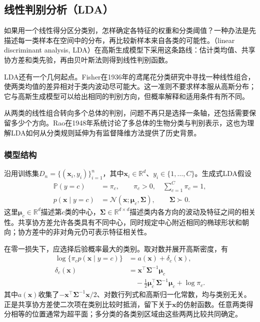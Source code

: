 \subsection{线性判别分析（LDA）}
\label{sec:classification-lda}

如果用一个线性得分区分类别，怎样确定各特征的权重和分类阈值？一种办法是先描述每一类样本在空间中的分布，再比较新样本来自各类的可能性。（linear discriminant analysis, LDA）在高斯生成模型下采用这条路线：估计类均值、共享协方差和类先验，再由贝叶斯法则得到线性判别函数。

LDA还有一个几何起点。Fisher在1936年的鸢尾花分类研究中寻找一种线性组合，使两类均值的差异相对于类内波动尽可能大。这一准则不要求样本服从高斯分布；它与高斯生成模型可以给出相同的判别方向，但概率解释和适用条件有所不同。

从两类的线性组合转向多个总体的判别，问题不再只是选择一条轴，还包括需要保留多少个方向。Rao在1948年系统讨论了多总体的生物分类与判别表示，这也为理解LDA如何从分类规则延伸为有监督降维方法提供了历史背景。

\subsubsection{模型结构}
\label{sec:classification-lda-model}

沿用训练集$D_n=\{(\bm{x}_i,y_i)\}_{i=1}^{n}$，其中$\bm{x}_i\in\mathbb{R}^{d}$、$y_i\in\{1,\ldots,C\}$。生成式LDA假设
\begin{equation}
  \label{eq:classification-lda-distribution}
  \begin{aligned}
    \mathbb{P}(y=c)&=\pi_c,\qquad \pi_c>0,\quad
      \sum_{c=1}^{C}\pi_c=1,\\
    p(\bm{x}\mid y=c)&=\mathcal{N}(\bm{x};\bm{\mu}_c,\bm{\Sigma}),
      \qquad \bm{\Sigma}\succ0 .
  \end{aligned}
\end{equation}
这里$\bm{\mu}_c\in\mathbb{R}^{d}$描述第$c$类的中心，$\bm{\Sigma}\in\mathbb{R}^{d\times d}$描述类内各方向的波动及特征之间的相关性。共享协方差允许各类具有不同中心，同时规定中心附近相同的椭球形状和朝向；协方差中的非对角元仍可表示特征相关性。

在零一损失下，应选择后验概率最大的类别。取对数并展开高斯密度，有
\begin{equation}
  \label{eq:classification-lda-score}
  \begin{aligned}
    \log\{\pi_c p(\bm{x}\mid y=c)\}
      &=a(\bm{x})+\delta_c(\bm{x}),\\
    \delta_c(\bm{x})
      &=\bm{x}^{\top}\bm{\Sigma}^{-1}\bm{\mu}_c\\
      &\quad-\frac12\bm{\mu}_c^{\top}\bm{\Sigma}^{-1}\bm{\mu}_c
        +\log\pi_c .
  \end{aligned}
\end{equation}
其中$a(\bm{x})$收集了$-\bm{x}^{\top}\bm{\Sigma}^{-1}\bm{x}/2$、对数行列式和高斯归一化常数，均与类别无关。正是共享协方差使二次项在类别比较时抵消，留下关于$\bm{x}$的仿射函数。任意两类得分相等的位置通常为超平面；多分类的各类别区域由这些两两比较共同确定。

